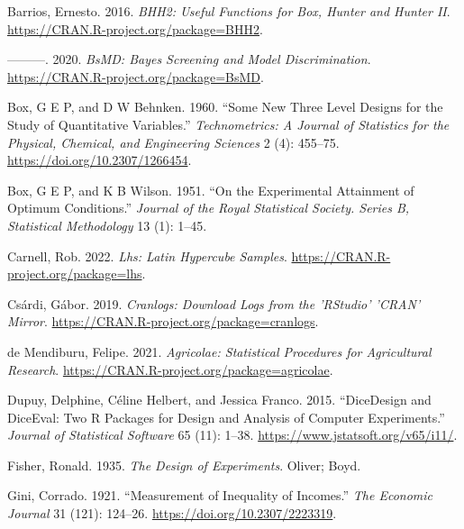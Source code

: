\documentclass{article}
\newlength{\cslhangindent}
\newlength{\cslentryspacingunit} %
\newenvironment{CSLReferences}[2] %
 {%
  \setlength{\parindent}{0pt}
  \ifodd #1
  \let\oldpar\par
  \def\par{\hangindent=\cslhangindent\oldpar}
  \fi
  \setlength{\parskip}{#2\cslentryspacingunit}
 }%
 {}
\begin{document}
\hypertarget{refs}{}
\begin{CSLReferences}{1}{0}
\leavevmode{}%
Barrios, Ernesto. 2016. \emph{BHH2: Useful Functions for Box, Hunter and
Hunter II}. \url{https://CRAN.R-project.org/package=BHH2}.

\leavevmode{}%
---------. 2020. \emph{BsMD: Bayes Screening and Model Discrimination}.
\url{https://CRAN.R-project.org/package=BsMD}.

\leavevmode{}%
Box, G E P, and D W Behnken. 1960. {``Some New Three Level Designs for
the Study of Quantitative Variables.''} \emph{Technometrics: A Journal
of Statistics for the Physical, Chemical, and Engineering Sciences} 2
(4): 455--75. \url{https://doi.org/10.2307/1266454}.

\leavevmode{}%
Box, G E P, and K B Wilson. 1951. {``On the Experimental Attainment of
Optimum Conditions.''} \emph{Journal of the Royal Statistical Society.
Series B, Statistical Methodology} 13 (1): 1--45.

\leavevmode{}%
Carnell, Rob. 2022. \emph{Lhs: Latin Hypercube Samples}.
\url{https://CRAN.R-project.org/package=lhs}.

\leavevmode{}%
Csárdi, Gábor. 2019. \emph{Cranlogs: Download Logs from the 'RStudio'
'CRAN' Mirror}. \url{https://CRAN.R-project.org/package=cranlogs}.

\leavevmode{}%
de Mendiburu, Felipe. 2021. \emph{Agricolae: Statistical Procedures for
Agricultural Research}.
\url{https://CRAN.R-project.org/package=agricolae}.

\leavevmode{}%
Dupuy, Delphine, Céline Helbert, and Jessica Franco. 2015.
{``{DiceDesign} and {DiceEval}: Two {R} Packages for Design and Analysis
of Computer Experiments.''} \emph{Journal of Statistical Software} 65
(11): 1--38. \url{https://www.jstatsoft.org/v65/i11/}.

\leavevmode{}%
Fisher, Ronald. 1935. \emph{The Design of Experiments}. Oliver; Boyd.

\leavevmode{}%
Gini, Corrado. 1921. {``Measurement of Inequality of Incomes.''}
\emph{The Economic Journal} 31 (121): 124--26.
\url{https://doi.org/10.2307/2223319}.


\end{CSLReferences}
\end{document}
